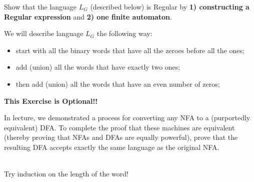 \documentclass[12pt]{article}
\newenvironment{exercise}[2][Exercise]{\begin{trivlist}
\item[\hskip \labelsep {\bfseries #1}\hskip \labelsep {\bfseries #2.}]}{\end{trivlist}}
\newenvironment{solution}[1][{\color{red} Solution:}]{\begin{trivlist}
\item[\hskip \labelsep {\bfseries #1}\hskip \labelsep {\bfseries}]}{\end{trivlist}}
\begin{document}
\begin{solution}

\end{solution}

\newpage


\begin{exercise}{4}

Show that the language $L_G$ (described below) is Regular by \textbf{1) constructing a Regular expression} and \textbf{ 2) one finite automaton}.


We will describe language $L_G$ the following way: 

\begin{itemize}
    \item start with all the binary words that have all the zeroes before all the ones;
    \item add (union) all the words that have exactly two ones;
    \item then add (union) all the words that have an even number of zeros;
\end{itemize}

\end{exercise}

\begin{solution} \quad

\end{solution}

\newpage


\begin{exercise}{5}

\textbf{This Exercise is Optional!!}

In lecture, we demonstrated a process for converting any NFA to a (purportedly equivalent) DFA. To complete the proof that these machines are equivalent (thereby proving that NFAs and DFAs are equally powerful), prove that the resulting DFA accepts exactly the same language as the original NFA.\\\\
\begin{tip}
Try induction on the length of the word!
\end{tip}
\end{exercise}
\end{document}
